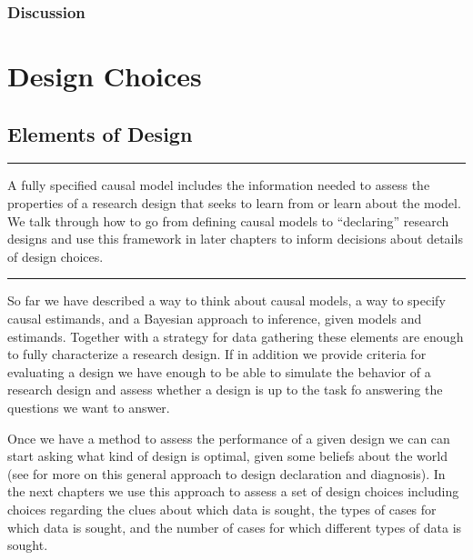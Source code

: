 \documentclass[12pt,]{book}
\begin{document}
\hypertarget{discussion}{%
\section{Discussion}\label{discussion}}

\hypertarget{part-design-choices}{%
\part{Design Choices}\label{part-design-choices}}

\hypertarget{elements-of-design}{%
\chapter{Elements of Design}\label{elements-of-design}}

\begin{center}\rule{0.5\linewidth}{\linethickness}\end{center}

A fully specified causal model includes the information needed to assess the properties of a research design that seeks to learn from or learn about the model. We talk through how to go from defining causal models to ``declaring'' research designs and use this framework in later chapters to inform decisions about details of design choices.

\begin{center}\rule{0.5\linewidth}{\linethickness}\end{center}

So far we have described a way to think about causal models, a way to specify causal estimands, and a Bayesian approach to inference, given models and estimands. Together with a strategy for data gathering these elements are enough to fully characterize a research design. If in addition we provide criteria for evaluating a design we have enough to be able to simulate the behavior of a research design and assess whether a design is up to the task fo answering the questions we want to answer.

Once we have a method to assess the performance of a given design we can can start asking what kind of design is optimal, given some beliefs about the world (see \citet{blair2016declaring} for more on this general approach to design declaration and diagnosis). In the next chapters we use this approach to assess a set of design choices including choices regarding the clues about which data is sought, the types of cases for which data is sought, and the number of cases for which different types of data is sought.
\end{document}
